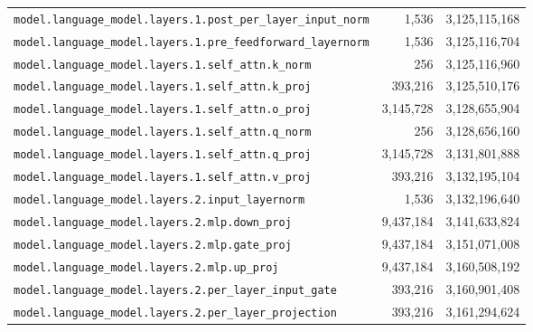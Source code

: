 \documentclass[10pt,a4paper]{article}
\theoremstyle{definition}
\begin{document}
\begin{appendices}
\begin{longtable}{p{9.5cm}rr}
\texttt{model.\allowbreak{}language\_model.\allowbreak{}layers.\allowbreak{}1.\allowbreak{}post\_per\_layer\_input\_norm} & 1,536 & 3,125,115,168 \\
\texttt{model.\allowbreak{}language\_model.\allowbreak{}layers.\allowbreak{}1.\allowbreak{}pre\_feedforward\_layernorm} & 1,536 & 3,125,116,704 \\
\texttt{model.\allowbreak{}language\_model.\allowbreak{}layers.\allowbreak{}1.\allowbreak{}self\_attn.\allowbreak{}k\_norm} & 256 & 3,125,116,960 \\
\texttt{model.\allowbreak{}language\_model.\allowbreak{}layers.\allowbreak{}1.\allowbreak{}self\_attn.\allowbreak{}k\_proj} & 393,216 & 3,125,510,176 \\
\texttt{model.\allowbreak{}language\_model.\allowbreak{}layers.\allowbreak{}1.\allowbreak{}self\_attn.\allowbreak{}o\_proj} & 3,145,728 & 3,128,655,904 \\
\texttt{model.\allowbreak{}language\_model.\allowbreak{}layers.\allowbreak{}1.\allowbreak{}self\_attn.\allowbreak{}q\_norm} & 256 & 3,128,656,160 \\
\texttt{model.\allowbreak{}language\_model.\allowbreak{}layers.\allowbreak{}1.\allowbreak{}self\_attn.\allowbreak{}q\_proj} & 3,145,728 & 3,131,801,888 \\
\texttt{model.\allowbreak{}language\_model.\allowbreak{}layers.\allowbreak{}1.\allowbreak{}self\_attn.\allowbreak{}v\_proj} & 393,216 & 3,132,195,104 \\
\texttt{model.\allowbreak{}language\_model.\allowbreak{}layers.\allowbreak{}2.\allowbreak{}input\_layernorm} & 1,536 & 3,132,196,640 \\
\texttt{model.\allowbreak{}language\_model.\allowbreak{}layers.\allowbreak{}2.\allowbreak{}mlp.\allowbreak{}down\_proj} & 9,437,184 & 3,141,633,824 \\
\texttt{model.\allowbreak{}language\_model.\allowbreak{}layers.\allowbreak{}2.\allowbreak{}mlp.\allowbreak{}gate\_proj} & 9,437,184 & 3,151,071,008 \\
\texttt{model.\allowbreak{}language\_model.\allowbreak{}layers.\allowbreak{}2.\allowbreak{}mlp.\allowbreak{}up\_proj} & 9,437,184 & 3,160,508,192 \\
\texttt{model.\allowbreak{}language\_model.\allowbreak{}layers.\allowbreak{}2.\allowbreak{}per\_layer\_input\_gate} & 393,216 & 3,160,901,408 \\
\texttt{model.\allowbreak{}language\_model.\allowbreak{}layers.\allowbreak{}2.\allowbreak{}per\_layer\_projection} & 393,216 & 3,161,294,624 \\

\end{longtable}
\end{appendices}
\end{document}
